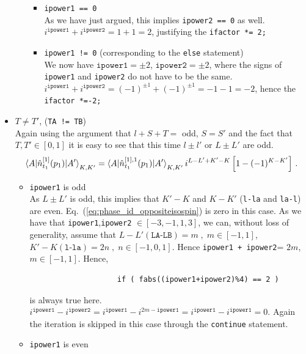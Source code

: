 \documentclass[10pt]{article}
\begin{document}
\begin{itemize}
\begin{itemize}
			 \begin{itemize}
			 	\item \texttt{ipower1 == 0} \\
			 		As we have just argued, this implies \texttt{ipower2 == 0} as well. $i^{\texttt{ipower1}} + i^{\texttt{ipower2}} = 1 + 1 = 2$, justifying the \texttt{ifactor *= 2;}
			 	\item \texttt{ipower1 != 0} (corresponding to the \texttt{else} statement) \\
			 		We now have $\texttt{ipower1} = \pm 2$, $\texttt{ipower2} = \pm 2$, where the signs of \texttt{ipower1} and \texttt{ipower2} do not have to be the same. $i^{\texttt{ipower1}} + i^{\texttt{ipower2}} = (-1)^{\pm 1} + (-1)^{\pm 1} = -1 -1 = -2$, hence the \texttt{ifactor *=-2;}
			 \end{itemize}
		\end{itemize}
	\item $ T \neq T'$, (\texttt{TA != TB}) \\
		Again using the argument that $l+S+T=$ odd, $S=S'$ and the fact that $T,T' \in [0,1]$ it is easy to see that this time $l \pm l'$ or $L \pm L'$ are odd.
		\begin{align}
			\braket{ A | \hat{n}_{t_1}^{[1]}(p_1) | A'}_{K,K'} = \braket{ A | \hat{n}_{t_1}^{[1],1}(p_1) | A'}_{K,K'} i^{L-L'+K'-K} \left[ 1 - (-1)^{K-K'} \right] \, .
			\label{eq:phase_id_oppositeisospin}
		\end{align}			
		\begin{itemize}
			\item \texttt{ipower1} is odd \\
				As $L \pm L'$ is odd, this implies that $K'-K$ and $K-K'$ (\texttt{l-la} and \texttt{la-l}) are even. Eq.~(\ref{eq:phase_id_oppositeisospin}) is zero in this case.
				As we have that \texttt{ipower1},\texttt{ipower2} $\in [-3,-1,1,3]$, we can, without loss of generality, assume that $L-L' (\texttt{LA-LB}) = m \; , \; m \in [-1,1]$, $K'-K (\texttt{l-la}) = 2n \; , \; n \in [-1,0,1]$. Hence \texttt{ipower1 + ipower2}= $2m$, $m \in [-1,1]$. Hence,
				\begin{verbatim}
					if ( fabs((ipower1+ipower2)%4) == 2 )
				\end{verbatim}
				is always true here. $i^{\texttt{ipower1}} - i^{\texttt{ipower2}} = i^{\texttt{ipower1}} - i^{2m - \texttt{ipower1}} = i^{\texttt{ipower1}} - i^{\texttt{ipower1}}= 0$.  Again the iteration is skipped in this case through the \texttt{continue} statement.
				\item \texttt{ipower1} is even \\

\end{itemize}
\end{itemize}
\end{document}
